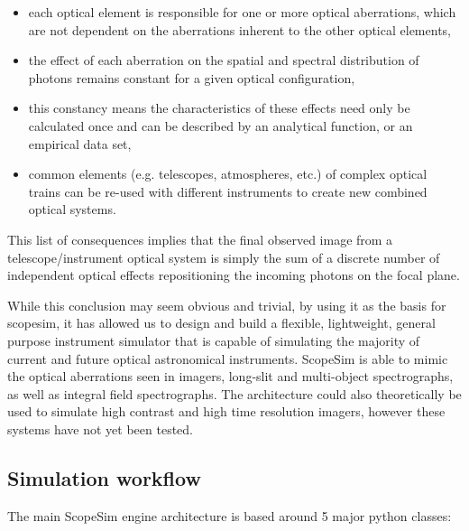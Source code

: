 \begin{itemize}
\item each optical element is responsible for one or more optical aberrations, which are not dependent on the aberrations inherent to the other optical elements,

\item the effect of each aberration on the spatial and spectral distribution of photons remains constant for a given optical configuration,

\item this constancy means the characteristics of these effects need only be calculated once and can be described by an analytical function, or an empirical data set,

\item common elements (e.g. telescopes, atmospheres, etc.) of complex optical trains can be re-used with different instruments to create new combined optical systems.
\end{itemize}

This list of consequences implies that the final observed image from a telescope/instrument optical system is simply the sum of a discrete number of independent optical effects repositioning the incoming photons on the focal plane.

While this conclusion may seem obvious and trivial, by using it as the basis for scopesim, it has allowed us to design and build a flexible, lightweight, general purpose instrument simulator that is capable of simulating the majority of current and future optical astronomical instruments.
ScopeSim is able to mimic the optical aberrations seen in imagers, long-slit and multi-object spectrographs, as well as integral field spectrographs.
The architecture could also theoretically be used to simulate high contrast and high time resolution imagers, however these systems have not yet been tested.


\subsection{Simulation workflow%
  \label{simulation-workflow}%
}

The main ScopeSim engine architecture is based around 5 major python classes:


